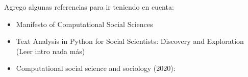 
Agrego algunas referencias para ir teniendo en cuenta:

\begin{itemize}
    \item Manifesto of Computational Social Sciences \cite{conte2012manifesto}
    \item Text Analysis in Python for Social Scientists: Discovery and Exploration \cite{hovy2020text} (Leer intro nada más)
    \item Computational social science and sociology (2020): \cite{edelmann2020computational}
\end{itemize}